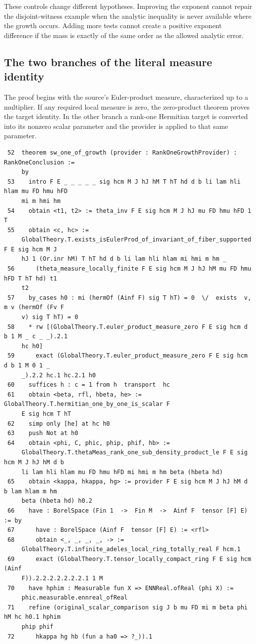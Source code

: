 \documentclass[12pt,letterpaper]{article}
\begin{document}
These controls change different hypotheses. Improving the exponent cannot repair the disjoint-witness example when the analytic inequality is never available where the growth occurs. Adding more tests cannot create a positive exponent difference if the mass is exactly of the same order as the allowed analytic error.
\clearpage{}\subsection*{The two branches of the literal measure identity}\label{extract-RankOneConsumer52}
The proof begins with the source's Euler-product measure, characterized up to a multiplier. If any required local measure is zero, the zero-product theorem proves the target identity. In the other branch a rank-one Hermitian target is converted into its nonzero scalar parameter and the provider is applied to that same parameter.
\par
{\fontsize{9.2}{11.2}\selectfont\begin{verbatim}
 52  theorem sw_one_of_growth (provider : RankOneGrowthProvider) : RankOneConclusion :=
     by
 53    intro F E _ _ _ _ _ sig hcm M J hJ hM T hT hd d b li lam hli hlam mu FD hmu hFD
     mi m hmi hm
 54    obtain <t1, t2> := theta_inv F E sig hcm M J hJ mu FD hmu hFD 1 T
 55    obtain <c, hc> :=
     GlobalTheory.T.exists_isEulerProd_of_invariant_of_fiber_supported F E sig hcm M J
     hJ 1 (Or.inr hM) T hT hd d b li lam hli hlam mi hmi m hm _
 56      (theta_measure_locally_finite F E sig hcm M J hJ hM mu FD hmu hFD T hT hd) t1
     t2
 57    by_cases h0 : mi (hermOf (Ainf F) sig T hT) = 0  \/  exists  v, m v (hermOf (Fv F
     v) sig T hT) = 0
 58    * rw [(GlobalTheory.T.euler_product_measure_zero F E sig hcm d b 1 M _ c _ _).2.1
     hc h0]
 59      exact (GlobalTheory.T.euler_product_measure_zero F E sig hcm d b 1 M 0 1 _
     _).2.2 hc.1 hc.2.1 h0
 60    suffices h : c = 1 from h  transport  hc
 61    obtain <beta, rfl, hbeta, he> := GlobalTheory.T.hermitian_one_by_one_is_scalar F
     E sig hcm T hT
 62    simp only [he] at hc h0
 63    push Not at h0
 64    obtain <phi, C, phic, phip, phif, hb> :=
     GlobalTheory.T.thetaMeas_rank_one_sub_density_product_le F E sig hcm M J hJ hM d b
     li lam hli hlam mu FD hmu hFD mi hmi m hm beta (hbeta hd)
 65    obtain <kappa, hkappa, hg> := provider F E sig hcm M J hJ hM d b lam hlam m hm
     beta (hbeta hd) h0.2
 66    have : BorelSpace (Fin 1  ->  Fin M  ->  Ainf F  tensor [F] E) := by
 67      have : BorelSpace (Ainf F  tensor [F] E) := <rfl>
 68      obtain <_, _, _, _, -> :=
     GlobalTheory.T.infinite_adeles_local_ring_totally_real F hcm.1
 69      exact (GlobalTheory.T.tensor_locally_compact_ring F E sig hcm (Ainf
     F)).2.2.2.2.2.2.2.1 1 M
 70    have hphim : Measurable fun X => ENNReal.ofReal (phi X) :=
     phic.measurable.ennreal_ofReal
 71    refine (original_scalar_comparison sig J b mu FD mi m beta phi hM hc h0.1 hphim
     phip phif
 72      hkappa hg hb (fun a ha0 => ?_)).1
\end{verbatim}}
\end{document}
